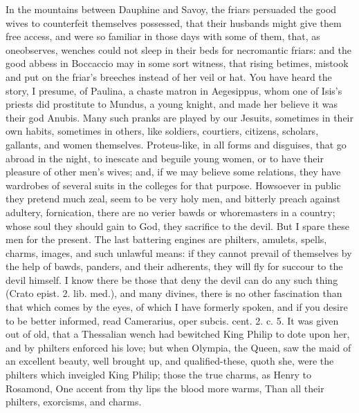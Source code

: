 {In the mountains between Dauphine and Savoy, the friars persuaded
the good wives to counterfeit themselves possessed, that their husbands
might give them free access, and were so familiar in those days with
some of them, that, as oneobserves, wenches could not sleep in
their beds for necromantic friars: and the good abbess in Boccaccio may
in some sort witness, that rising betimes, mistook and put on the
friar's breeches instead of her veil or hat. You have heard the story,
I presume, of  Paulina, a chaste matron in Aegesippus, whom one
of Isis's priests did prostitute to Mundus, a young knight, and made
her believe it was their god Anubis. Many such pranks are played by our
Jesuits, sometimes in their own habits, sometimes in others, like
soldiers, courtiers, citizens, scholars, gallants, and women
themselves. Proteus-like, in all forms and disguises, that go abroad in
the night, to inescate and beguile young women, or to have their
pleasure of other men's wives; and, if we may believe  some
relations, they have wardrobes of several suits in the colleges for
that purpose. Howsoever in public they pretend much zeal, seem to be
very holy men, and bitterly preach against adultery, fornication, there
are no verier bawds or whoremasters in a country; whose soul they
should gain to God, they sacrifice to the devil. But I spare these men
for the present.
The last battering engines are philters, amulets, spells, charms,
images, and such unlawful means: if they cannot prevail of themselves
by the help of bawds, panders, and their adherents, they will fly for
succour to the devil himself. I know there be those that deny the devil
can do any such thing (Crato epist. 2. lib. med.), and many divines,
there is no other fascination than that which comes by the eyes, of
which I have formerly spoken, and if you desire to be better informed,
read Camerarius, oper subcis. cent. 2. c. 5. It was given out of old,
that a Thessalian wench had bewitched King Philip to dote upon her, and
by philters enforced his love; but when Olympia, the Queen, saw the
maid of an excellent beauty, well brought up, and qualified-these,
quoth she, were the philters which inveigled King Philip; those the
true charms, as Henry to Rosamond,
One accent from thy lips the blood more warms,
Than all their philters, exorcisms, and charms.

}
